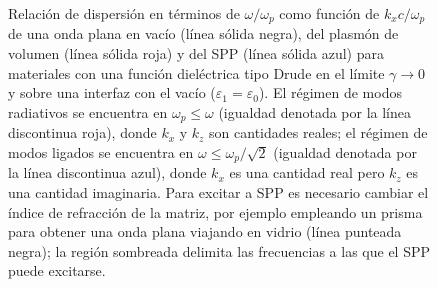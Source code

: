 \begin{figure}[h!]\centering
\vspace*{-1em}
	\caption{Relación de dispersión en términos de $\omega/\omega_p$ como función de $k_xc/\omega_p$ de una onda plana en vacío (línea sólida negra), del plasmón de volumen (línea sólida roja) y del SPP (línea sólida azul) para materiales con una función dieléctrica tipo Drude en el límite $\gamma\to 0$ y sobre una interfaz con el vacío ($\varepsilon_1 =\varepsilon_0$). El régimen de modos radiativos se encuentra en $\omega_p\leq\omega$ (igualdad denotada por la línea discontinua roja), donde $k_x$ y $k_z$ son cantidades reales; el régimen de modos ligados se encuentra en $\omega\leq\omega_p/\sqrt{2}$ (igualdad denotada por la línea discontinua azul), donde $k_x$ es una cantidad real pero $k_z$ es una cantidad imaginaria. Para excitar a SPP es necesario cambiar el índice de refracción de la matriz, por ejemplo empleando un prisma para obtener una onda plana viajando en vidrio (línea punteada negra); la región sombreada delimita las frecuencias a las que el SPP puede excitarse.}
	\label{fig:Relaciones_de_dispersion}
	\end{figure}		

